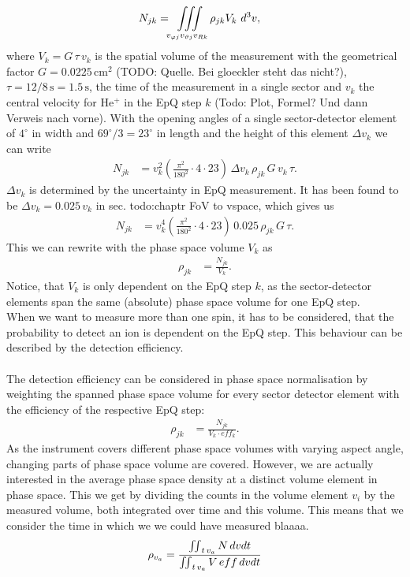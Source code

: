 \begin{align*}
N_{jk} &= \iiint\displaylimits_{v_{\varphi j}v_{\vartheta j}v_{R k}} \rho_{jk}	V_k	\,\,	d^3v,
\end{align*}
where $V_k = G \, \tau \, v_k$ is the spatial volume of the measurement with the geometrical factor $G = 0.0225 \,\mathrm{cm^2}$ (TODO: Quelle. Bei gloeckler steht das nicht?), $\tau = 12/8\,\mathrm{s} = 1.5\,\mathrm{s}$, the time of the measurement in a single sector and $v_k$ the central velocity for $\mathrm{He^{+}}$ in the EpQ step $k$ (Todo: Plot, Formel? Und dann Verweis nach vorne).
With the opening angles of a single sector-detector element of $4^\circ$ in width and $69^\circ /3 = 23^\circ$ in length and the height of this element $\Delta v_k$ we can write
\begin{align*}
N_{jk} &= v^2_k \left(\frac{\pi^2}{180^2}\cdot4 \cdot 23\right) \, \Delta v_k \, \rho_{jk} \,	G \, v_k \, \tau.
\end{align*}
$\Delta v_k$ is determined by the uncertainty in EpQ measurement. It has been found to be $\Delta v_k = 0.025 \, v_k$ in sec. todo:chaptr FoV to vspace, which gives us
\begin{align*}
N_{jk} &= v^4_k \left(\frac{\pi^2}{180^2}\cdot4 \cdot 23\right) \, 0.025\, \rho_{jk} \, G  \, \tau.
\end{align*}
This we can rewrite with the phase space volume $V_{k}$ as 
\begin{align*}
\rho_{jk} &= \frac{N_{jk}}{V_{k}}.
\end{align*}
Notice, that $V_{k}$ is only dependent on the EpQ step $k$, as the sector-detector elements span the same (absolute) phase space volume for one EpQ step.\\
When we want to measure more than one spin, it has to be considered, that the probability to detect an ion is dependent on the EpQ step. This behaviour can be described by the detection efficiency.
\\ \\
The detection efficiency can be considered in phase space normalisation by weighting the spanned phase space volume for every sector detector element with the efficiency of the respective EpQ step: 
\begin{align*}
\rho_{jk} &= \frac{N_{jk}}{V_{k}\cdot eff_k}.
\end{align*}
As the instrument covers different phase space volumes with varying aspect angle, changing parts of phase space volume are covered.
However, we are actually interested in the average phase space density at a distinct volume element in phase space. This we get by dividing the counts in the volume element $v_i$ by the measured volume, both integrated over time and this volume. This means that we consider the time in which we we could have measured blaaaa.
\begin{align*}
\rho_{v_a} = \frac{\iint\displaylimits_{t\,v_a} N \, dv dt}{\iint\displaylimits_{t\,v_a} V\,eff\,dv dt}
\end{align*}




